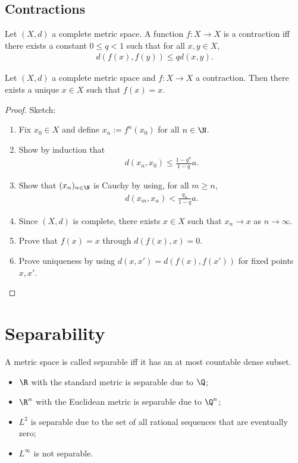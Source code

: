\documentclass{article}
\begin{document}
\subsection{Contractions}

\begin{definition}[Contraction]
	Let $(X,d)$ a complete metric space. A function $f:X\to X$ is a contraction iff
	there exists a constant $0\leq q<1$ such that for all $x,y\in X$,
	\begin{align}
		\label{contraction_criterion}
		d(f(x),f(y))\leq qd(x,y).
	\end{align}
\end{definition}

\begin{theorem}
	Let $(X,d)$ a complete metric space and $f:X\to X$ a contraction. Then there exists a
	unique $x\in X$ such that $f(x)=x$.
	\begin{proof}
		Sketch:
		\begin{enumerate}
			\item Fix $x_0\in X$ and define $x_n:= f^n(x_0)$ for all $n\in\N$.
			\item Show by induction that \begin{align*}
				d(x_n,x_0)\leq \frac{1-q^n}{1-q}a.
			\end{align*}
			\item Show that $(x_n)_{n\in\N}$ is Cauchy by using, for all $m\geq n$, \begin{align*}
				d(x_m,x_n)<\frac{q_n}{1-q}a.
			\end{align*}
			\item Since $(X,d)$ is complete, there exists $x\in X$ such that $x_n\to x$ as $n\to\infty$.
			\item Prove that $f(x)=x$ through $d(f(x),x)=0$.
			\item Prove uniqueness by using $d(x,x')=d(f(x),f(x'))$ for fixed points $x,x'$.
		\end{enumerate}
	\end{proof}
\end{theorem}

\section{Separability}

\begin{definition}
	A metric space is called separable iff it has an at most countable dense subset.
\end{definition}
\begin{itemize}
	\item $\R$ with the standard metric is separable due to $\Q$;
	\item $\R^n$ with the Euclidean metric is separable due to $\Q^n$;
	\item $L^2$ is separable due to the set of all rational sequences that are eventually zero;
	\item $L^\infty$ is not separable.
\end{itemize}
\end{document}
